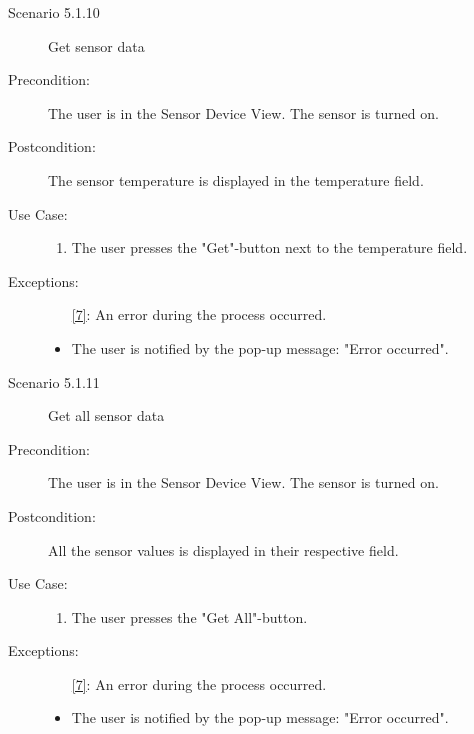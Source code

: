 \documentclass[a4paper]{article}
\begin{document}
\begin{description}
\item[]

\item[Scenario 5.1.10] Get sensor data
\item[Precondition:] The user is in the Sensor Device View. The sensor is turned on.
\item[Postcondition:] The sensor temperature is displayed in the temperature field.
\item[Use Case:]\mbox{}
\begin{enumerate}
\item \label{7} The user presses the "Get"-button next to the temperature field.

\end{enumerate}

\item[Exceptions:]
\item[]

\begin{itemize}
\item [\ref{7}:] An error during the process occurred.
\item The user is notified by the pop-up message: "Error occurred".
\end{itemize}

\item[]

\item[Scenario 5.1.11] Get all sensor data
\item[Precondition:] The user is in the Sensor Device View. The sensor is turned on.
\item[Postcondition:] All the sensor values is displayed in their respective field.
\item[Use Case:]\mbox{}
\begin{enumerate}
\item \label{7} The user presses the "Get All"-button.

\end{enumerate}

\item[Exceptions:]
\item[]

\begin{itemize}
\item [\ref{7}:] An error during the process occurred.
\item The user is notified by the pop-up message: "Error occurred".
\end{itemize}

\item[]


\end{description}
\end{document}
